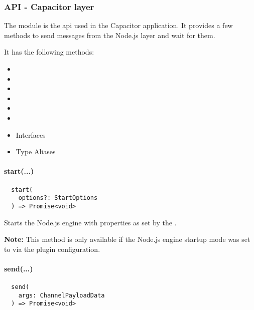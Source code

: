 \subsubsection{API - Capacitor layer}
\label{sec:Capacitor-NodeJS:API_CapacitorLayer}

The  module is the \ac{api} used in the Capacitor application.
It provides a few methods to send messages from the Node.js layer and wait for them.

It has the following methods:

\begin{itemize}
  \setlength\itemsep{-0.8em}
  \item {}
  \item {}
  \item {}
  \item {}
  \item {}
  \item {}
  \item Interfaces
  \item Type Aliases
\end{itemize}


\paragraph{start(...)}

\begin{verbatim}
  start(
    options?: StartOptions
  ) => Promise<void>
\end{verbatim}

Starts the Node.js engine with properties as set by the .

\textbf{Note:} This method is only available if the Node.js engine startup mode was set to  via the plugin configuration.


\paragraph{send(...)}

\begin{verbatim}
  send(
    args: ChannelPayloadData
  ) => Promise<void>
\end{verbatim}

